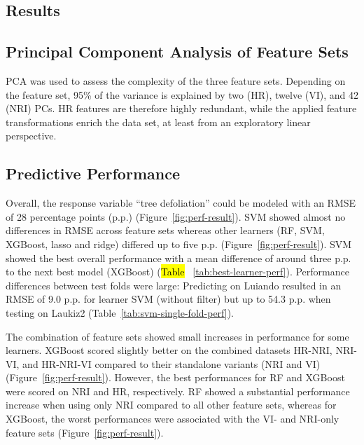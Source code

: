 \documentclass[remotesensing,article,accept,moreauthors,pdftex]{Definitions/mdpi}
\begin{document}
\begin{paracol}{2}
\section{Results}

\subsection{Principal Component Analysis of Feature Sets}

PCA was used to assess the complexity of the three feature sets.
Depending on the feature set, 95\% of the variance is explained by two (HR), twelve (VI), and 42 (NRI) \ac{PC}s.
HR features are therefore highly redundant, while the applied feature transformations enrich the data set, at least from an exploratory linear perspective.

\subsection{Predictive Performance}

Overall, the response variable \enquote{tree defoliation} could be modeled with an \ac{RMSE} of 28 percentage points (p.p.) (Figure~\ref{fig:perf-result}).
SVM showed almost no differences in RMSE across feature sets whereas other learners (RF, SVM, XGBoost, lasso and ridge) differed up to five p.p. (Figure~\ref{fig:perf-result}).
SVM showed the best overall performance with a mean difference of around three p.p. to the next best model (XGBoost) (\hl{Table}%
~\ref{tab:best-learner-perf}).
Performance differences between test folds were large: Predicting on Luiando resulted in an RMSE of 9.0 p.p. for learner SVM (without filter) but up to 54.3 p.p. when testing on Laukiz2 (Table~\ref{tab:svm-single-fold-perf}).

The combination of feature sets showed small increases in performance for some learners.
XGBoost scored slightly better on the combined datasets HR-NRI, NRI-VI, and HR-NRI-VI compared to their standalone variants (NRI and VI) (Figure~\ref{fig:perf-result}).
However, the best performances for RF and XGBoost were scored on NRI and HR, respectively.
RF showed a substantial performance increase when using only NRI compared to all other feature sets, whereas for XGBoost, the worst performances were associated with the VI- and NRI-only feature sets (Figure~\ref{fig:perf-result}).


\end{paracol}
\end{document}
